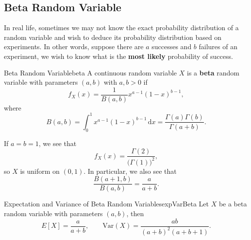 \documentclass[math]{amznotes}
\theoremstyle{remark}
\newcommand{\dif}{\mathrm{d}}
\begin{document}
\subsection{Beta Random Variable}
In real life, sometimes we may not know the exact probability distribution of a random variable and wish to deduce its probability distribution based on experiments. In other words, suppose there are $a$ successes and $b$ failures of an experiment, we wish to know what is the \textbf{most likely} probability of success.
\begin{dfnbox}{Beta Random Variable}{beta}
    A continuous random variable $X$ is a {\color{red} \textbf{beta}} random variable with parameters $(a, b)$ with $a, b > 0$ if 
    \begin{equation*}
        f_X(x) = \frac{1}{B(a, b)}x^{a - 1}(1 - x)^{b - 1},
    \end{equation*}
    where 
    \begin{equation*}
        B(a, b) = \int_{0}^{1}\!x^{a - 1}(1 - x)^{b - 1}\,\dif x = \frac{\Gamma(a)\Gamma(b)}{\Gamma(a + b)}.
    \end{equation*}
\end{dfnbox}
If $a = b = 1$, we see that
\begin{equation*}
    f_X(x) = \frac{\Gamma(2)}{\bigl(\Gamma(1)\bigr)^2},
\end{equation*}
so $X$ is uniform on $(0, 1)$. In particular, we also see that
\begin{equation*}
    \frac{B(a + 1, b)}{B(a, b)} = \frac{a}{a + b}.
\end{equation*}
\begin{thmbox}{Expectation and Variance of Beta Random Variables}{expVarBeta}
    Let $X$ be a beta random variable with parameters $(a, b)$, then 
    \begin{equation*}
        E[X] = \frac{a}{a + b}, \qquad \mathrm{Var}(X) = \frac{ab}{(a + b)^2(a + b + 1)}.
    \end{equation*}
\end{thmbox}
\end{document}
